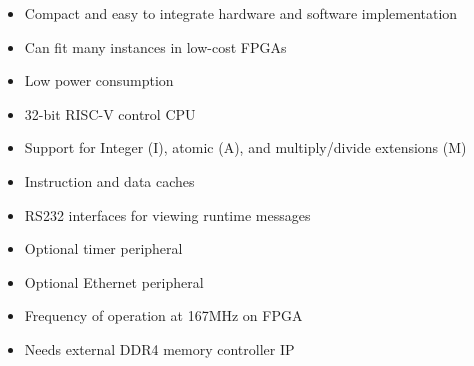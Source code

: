 %

\begin{itemize}
\item Compact and easy to integrate hardware and software implementation
\item Can fit many instances in low-cost FPGAs
\item Low power consumption
\item 32-bit RISC-V control CPU
\item Support for Integer (I), atomic (A), and multiply/divide extensions (M)
\item Instruction and data caches
\item RS232 interfaces for viewing runtime messages
\item Optional timer peripheral
\item Optional Ethernet peripheral
\item Frequency of operation at 167MHz on FPGA
\item Needs external DDR4 memory controller IP
\end{itemize}
